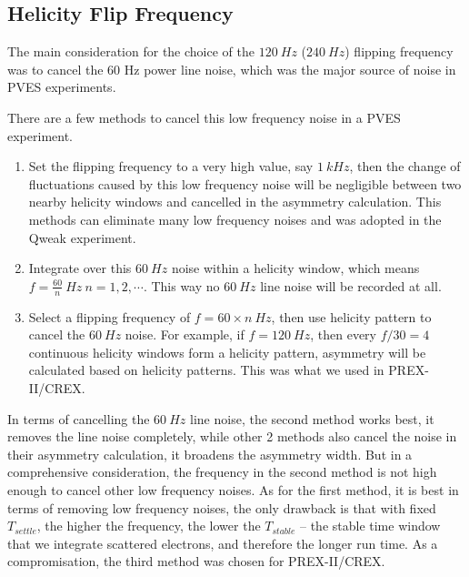 \subsection{Helicity Flip Frequency}
The main consideration for the choice of the $120\ Hz$ ($240\ Hz$) flipping frequency 
was to cancel the 60 Hz power line noise, which was the major source of noise
in PVES experiments. 

There are a few methods to cancel this low frequency noise in a PVES experiment.
\begin{enumerate}
    \item Set the flipping frequency to a very high value, say $1\ kHz$, then
	the change of fluctuations caused by this low frequency noise will be negligible
	between two nearby helicity windows and cancelled in the asymmetry calculation. 
	This methods can eliminate many low frequency noises and was adopted in the Qweak experiment.
    \item Integrate over this $60\ Hz$ noise within a helicity window, which means
	$f = \frac{60}{n}\ Hz\ n = 1, 2, \cdots$. This way no $60\ Hz$ line noise
	will be recorded at all.
    \item Select a flipping frequency of $f = 60 \times n\ Hz$,
	then use helicity pattern to cancel the $60\ Hz$ noise. For example, 
	if $f = 120\ Hz$, then every $f/30 = 4$ continuous helicity windows form a 
	helicity pattern, asymmetry will be calculated based on helicity patterns. 
	This was what we used in PREX-II/CREX.
\end{enumerate}

In terms of cancelling the $60\ Hz$ line noise, the second method works best,
it removes the line noise completely, while other 2 methods also cancel the noise
in their asymmetry calculation, it broadens the asymmetry width. But in a comprehensive
consideration, the frequency in the second method is not high enough to cancel
other low frequency noises. As for the first method, it is best in terms of
removing low frequency noises, the only drawback is that with fixed $T_{settle}$,
the higher the frequency, the lower the $T_{stable}$ -- the stable time window
that we integrate scattered electrons, and therefore the longer run time. 
As a compromisation, the third method was chosen for PREX-II/CREX.

